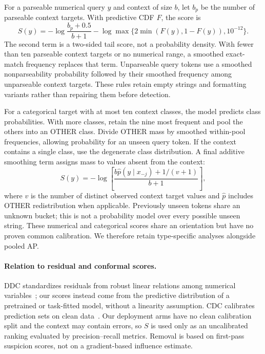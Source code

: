 For a parseable numerical query $y$ and context of size $b$, let $b_p$ be the
number of parseable context targets. With predictive CDF $F$, the score is
\begin{equation}
 S(y)=-\log\frac{b_p+0.5}{b+1}
       -\log\max\{2\min(F(y),1-F(y)),10^{-12}\}.
\end{equation}
The second term is a two-sided tail score, not a probability density. With fewer
than ten parseable context targets or no numerical range, a smoothed exact-match
frequency replaces that term. Unparseable query tokens use a smoothed
nonparseability probability followed by their smoothed frequency among
unparseable context targets. These rules retain empty strings and formatting
variants rather than repairing them before detection.

For a categorical target with at most ten context classes, the model predicts
class probabilities. With more classes, retain the nine most frequent and pool
the others into an OTHER class. Divide OTHER mass by smoothed within-pool
frequencies, allowing probability for an unseen query token. If the context
contains a single class, use the degenerate class distribution. A final
additive smoothing term assigns mass to values absent from the context:
\begin{equation}
 S(y)=-\log\left[\frac{b\widehat p(y\mid x_{-j})+1/(v+1)}{b+1}\right],
\end{equation}
where $v$ is the number of distinct observed context target values and
$\widehat p$ includes OTHER redistribution when applicable. Previously unseen
tokens share an unknown bucket; this is not a probability model over every
possible unseen string. These numerical
and categorical scores share an orientation but have no proven common
calibration. We therefore retain type-specific analyses alongside pooled AP.

\paragraph{Relation to residual and conformal scores.}
DDC standardizes residuals from robust linear relations among numerical
variables~\cite{rousseeuw2018ddc}; our scores instead come from the predictive
distribution of a pretrained or task-fitted model, without a linearity assumption.
CDC calibrates prediction sets on clean data~\cite{jager2024cdc}. Our deployment arms
have no clean calibration split and the context may contain errors, so $S$ is used
only as an uncalibrated ranking evaluated by precision--recall metrics. Removal is
based on first-pass suspicion scores, not on a gradient-based influence estimate.

